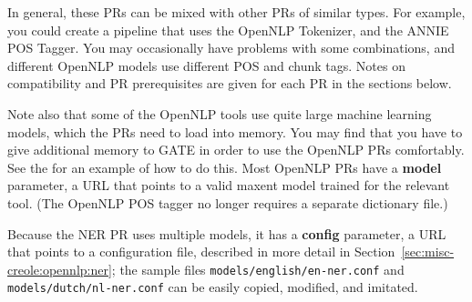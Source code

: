 In general, these PRs can be mixed with other PRs of similar types. For example,
you could create a pipeline that uses the OpenNLP Tokenizer, and the ANNIE POS
Tagger. You may occasionally have problems with some combinations, and different
OpenNLP models use different POS and chunk tags. Notes on compatibility and
PR prerequisites are given for each PR in the sections below.

Note also that some of the OpenNLP tools use quite large machine learning
models, which the PRs need to load into memory. You may find that you have
to give additional memory to GATE in order to use the OpenNLP PRs
comfortably. See the  for an example of how to do this.
% 
Most OpenNLP PRs have a \textbf{model} parameter, a URL that points to a valid
maxent model trained for the relevant tool.  (The OpenNLP POS tagger no longer
requires a separate dictionary file.)

Because the NER PR uses multiple models, it has a \textbf{config} parameter, a
URL that points to a configuration file, described in more detail in
Section~\ref{sec:misc-creole:opennlp:ner}; the sample files
\texttt{models/english/en-ner.conf} and \texttt{models/dutch/nl-ner.conf} can be
easily copied, modified, and imitated.

